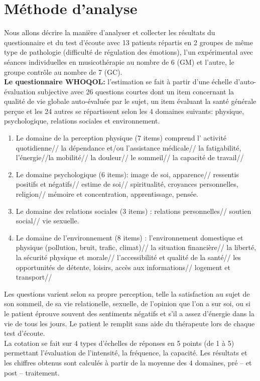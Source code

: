 \section{Méthode d'analyse}
Nous allons décrire la manière d'analyser et collecter les résultats du questionnaire et du test d'écoute 
avec 13 patients répartis en 2 groupes de même type de pathologie (difficulté de régulation des 
émotions), l'un expérimental avec séances individuelles en musicothérapie au nombre de 6 (GM) et 
l'autre, le groupe contrôle au 
nombre 
de 7 (GC).
 \\
\textbf{Le questionnaire WHOQOL:}
l'estimation se fait à partir d'une échelle
d'auto-évaluation subjective avec 26 questions courtes
dont un item concernant la qualité de vie globale
auto-évaluée par le sujet, un item évaluant la santé générale perçue
et les 24 autres se répartissent selon les 4 domaines suivants: physique, psychologique, relations 
sociales et environnement.
\begin{enumerate}
	\item  Le domaine de la perception physique (7 items) comprend l' activité quotidienne// la dépendance 
	et/ou l'assistance médicale// la fatigabilité, l'énergie//la mobilité// la douleur// le sommeil// la capacité 
	de travail//
	\item Le domaine psychologique (6 items):  image de soi, apparence// ressentis positifs et négatifs// 
	estime de soi// spiritualité, croyances personnelles, religion// mémoire et concentration, apprentissage, 
	pensée.
	\item Le domaine des relations sociales (3 items) : relations personnelles// soutien social// vie sexuelle.
	\item Le domaine de l'environnement (8 items) :
	l'environnement domestique et physique
	(pollution, bruit, trafic, climat)// la
	situation financière//  la liberté, la
	sécurité physique et morale//
	l'accessibilité et qualité de la santé// les
	opportunités de détente, loisirs, accès aux
	informations// logement et transport//
\end{enumerate}
Les questions varient selon sa propre perception, telle la satisfaction
au sujet de son  sommeil, de sa vie relationelle, sexuelle, de
l'opinion que l'on a sur soi, ou si le patient éprouve souvent des sentiments négatifs
et s'il a assez d'énergie dans la vie de tous les jours.
Le patient le remplit sans aide du
thérapeute lors de chaque test
d'écoute.
\\
La cotation se fait sur 4 types d'échelles de réponses en 5 points (de 1 à 5)
permettant l'évaluation de l'intensité, la fréquence, la capacité.
Les résultats et les chiffres obtenus  sont calculés à partir de la moyenne des 4
domaines, pré -- et post -- traitement.

